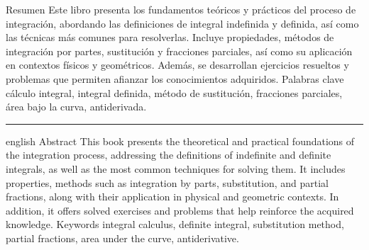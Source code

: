 \abstract
{Resumen}
{Este libro presenta los fundamentos teóricos y prácticos del proceso de integración, abordando las definiciones de integral indefinida y definida, así como las técnicas más comunes para resolverlas. Incluye propiedades, métodos de integración por partes, sustitución y fracciones parciales, así como su aplicación en contextos físicos y geométricos. Además, se desarrollan ejercicios resueltos y problemas que permiten afianzar los conocimientos adquiridos.}
{Palabras clave}
{cálculo integral, integral definida, método de sustitución, fracciones parciales, área bajo la curva, antiderivada.}

\noindent\rule{1.8cm}{0.4pt}

\vspace{3mm}

\begin{otherlanguage*}{english}
  \abstract
  {Abstract}
  {This book presents the theoretical and practical foundations of the integration process, addressing the definitions of indefinite and definite integrals, as well as the most common techniques for solving them. It includes properties, methods such as integration by parts, substitution, and partial fractions, along with their application in physical and geometric contexts. In addition, it offers solved exercises and problems that help reinforce the acquired knowledge.}
  {Keywords}
  {integral calculus, definite integral, substitution method, partial fractions, area under the curve, antiderivative.}
\end{otherlanguage*}

\vfill

\hfill{}
